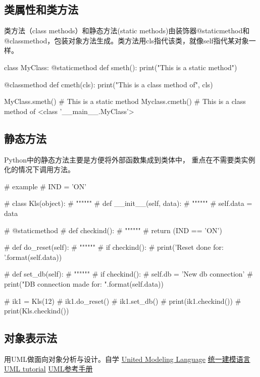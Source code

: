 \subsection{类属性和类方法}
类方法（class methods）和静态方法(static methods)由装饰器@staticmethod和@classmethod，包装对象方法生成。类方法用cls指代该类，就像self指代某对象一样。
\begin{python}
class MyClass:
    @staticmethod
    def smeth():
        print("This is a static method")

    @classmethod
    def cmeth(cls):
        print("This is a class method of", cls)

MyClass.smeth()
# This is a static method
Myclass.cmeth()
# This is a class method of <class '__main__.MyClass'>
\end{python}
\subsection{静态方法}
Python中的静态方法主要是方便将外部函数集成到类体中， 重点在不需要类实例化的情况下调用方法。
\begin{python}
# example
# IND = 'ON'

# class Kls(object):
#     """"""
#     def __init__(self, data):
#         """"""
#         self.data = data

#     @staticmethod
#     def checkind():
#         """"""
#         return (IND == 'ON')

#     def do_reset(self):
#         """"""
#         if checkind():
#             print('Reset done for: {}'.format(self.data))

#     def set_db(self):
#         """"""
#         if checkind():
#             self.db = 'New db connection'
#             print("DB connection made for: {}".format(self.data))

# ik1 = Kls(12)
# ik1.do_reset()
# ik1.set_db()
# print(ik1.checkind())
# print(Kls.checkind())
\end{python}

\subsection{对象表示法}
用UML做面向对象分析与设计。自学
\href{https://en.wikipedia.org/wiki/Unified_Modeling_Language}{United Modeling Language}
\href{http://www.uml.org/what-is-uml.htm}{统一建模语言}
\href{https://www.w3cschool.cn/uml_tutorial}{UML tutorial}
\href{file:./misc/UML_Tutorial.pdf}{UML参考手册}
